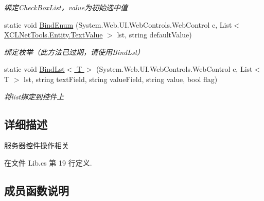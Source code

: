 \begin{DoxyCompactItemize}
\begin{DoxyCompactList}\small\item\em 绑定\+Check\+Box\+List，value为初始选中值 \end{DoxyCompactList}\item 
static void \hyperlink{class_x_c_l_net_tools_1_1_control_1_1_server_control_1_1_lib_acf0e494ba2e94742818fbebfd883ab17}{Bind\+Enum} (System.\+Web.\+U\+I.\+Web\+Controls.\+Web\+Control c, List$<$ \hyperlink{class_x_c_l_net_tools_1_1_entity_1_1_text_value}{X\+C\+L\+Net\+Tools.\+Entity.\+Text\+Value} $>$ lst, string default\+Value)
\begin{DoxyCompactList}\small\item\em 绑定枚举（此方法已过期，请使用\+Bind\+Lst） \end{DoxyCompactList}\item 
static void \hyperlink{class_x_c_l_net_tools_1_1_control_1_1_server_control_1_1_lib_ad5ebfd4eb97120e0049cd0260e150ed9}{Bind\+Lst$<$ T $>$} (System.\+Web.\+U\+I.\+Web\+Controls.\+Web\+Control c, List$<$ T $>$ lst, string text\+Field, string value\+Field, string value, bool flag)
\begin{DoxyCompactList}\small\item\em 将list绑定到控件上 \end{DoxyCompactList}\end{DoxyCompactItemize}


\subsection{详细描述}
服务器控件操作相关 



在文件 Lib.\+cs 第 19 行定义.



\subsection{成员函数说明}
\mbox{\label{class_x_c_l_net_tools_1_1_control_1_1_server_control_1_1_lib_af2a5dcd9fa457696d15a072e4772b861}} 
